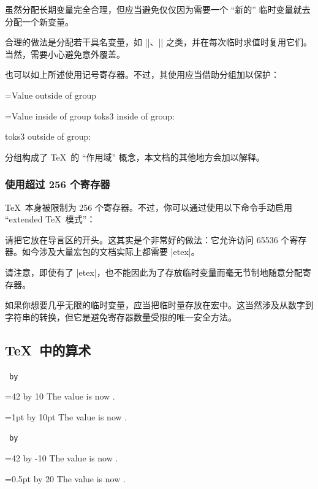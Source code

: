 \documentclass[a4paper,doc2]{ltxdoc}
\begin{document}
虽然分配长期变量完全合理，但应当避免仅仅因为需要一个 ``新的'' 临时变量就去分配一个新变量。

合理的做法是分配若干具名变量，如 |\tempa|、|\tempb| 之类，并在每次临时求值时复用它们。当然，需要小心避免意外覆盖。

也可以如上所述使用记号寄存器。不过，其使用应当借助分组加以保护：
\begin{codeexample}[]
={Value outside of group}

\begingroup
{}={Value inside of group}
toks3 inside of group: \the{}
\endgroup

toks3 outside of group: \the{}
\end{codeexample}
	分组构成了 \TeX\ 的 ``作用域'' 概念，本文档的其他地方会加以解释。

\subsubsection{使用超过 256 个寄存器}
\TeX\ 本身被限制为 256 个寄存器。不过，你可以通过使用以下命令手动启用 ``extended \TeX\ 模式''：
\begin{codeexample}
\usepackage{etex}
\end{codeexample}
请把它放在导言区的开头。这其实是个非常好的做法：它允许访问 65536 个寄存器。如今涉及大量宏包的文档实际上都需要 |etex|。

请注意，即使有了 |etex|，也不能因此为了存放临时变量而毫无节制地随意分配寄存器。

如果你想要几乎无限的临时变量，应当把临时量存放在宏中。这当然涉及从数字到字符串的转换，但它是避免寄存器数量受限的唯一安全方法。

\subsection{\TeX\ 中的算术}
\begin{command}{\advance{}\texttt{ by}}
\begin{codeexample}[]
=42
\advance{} by 10
The value is now \the{}.
\end{codeexample}

\begin{codeexample}[]
=1pt
\advance{} by 10pt
The value is now \the{}.
\end{codeexample}
\end{command}

\begin{command}{\multiply{}\texttt{ by}}
\begin{codeexample}[]
=42
\multiply{} by -10
The value is now \the{}.
\end{codeexample}

\begin{codeexample}[]
=0.5pt
\multiply{} by 20
The value is now \the{}.
\end{codeexample}
\end{command}
\end{document}
